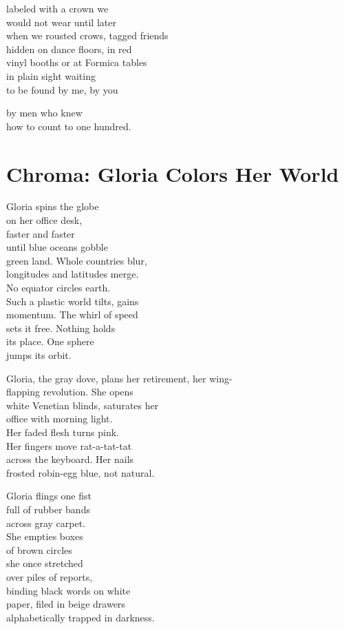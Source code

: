 \documentclass[twoside,10pt]{book}
\begin{document}
labeled with a crown we\\
would not wear until later\\
when we rousted crows, tagged friends\\
hidden on dance floors, in red\\
vinyl booths or at Formica tables\\
in plain sight waiting\\
to be found by me, by you

by men who knew\\
how to count to one hundred.


\clearpage
\section{Chroma: Gloria Colors Her World}

Gloria spins the globe\\
on her office desk,\\
faster and faster\\
until blue oceans gobble\\
green land. Whole countries blur,\\
longitudes and latitudes merge.\\
No equator circles earth.\\
Such a plastic world tilts, gains\\
momentum. The whirl of speed\\
sets it free. Nothing holds\\
its place. One sphere\\
jumps its orbit.

Gloria, the gray dove, plans her retirement, her wing-\\
flapping revolution. She opens\\
white Venetian blinds, saturates her\\
office with morning light.\\
Her faded flesh turns pink.\\
Her fingers move rat-a-tat-tat\\
across the keyboard. Her nails\\
frosted robin-egg blue, not natural.

Gloria flings one fist\\
full of rubber bands\\
across gray carpet.\\
She empties boxes\\
of brown circles\\
she once stretched\\
over piles of reports,\\
binding black words on white\\
paper, filed in beige drawers\\
alphabetically trapped in darkness.
\end{document}
